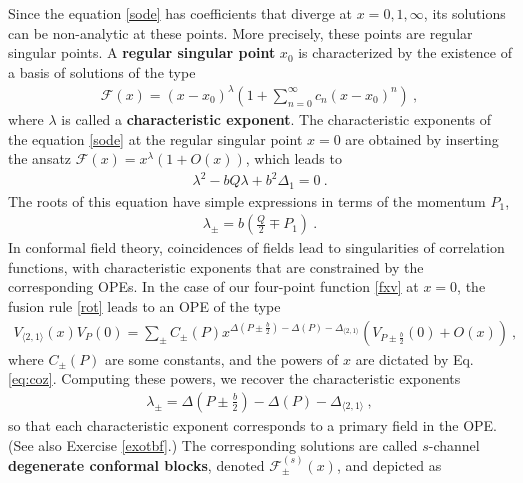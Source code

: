 \documentclass[12pt, a4paper, notitlepage, twoside]{report}
\numberwithin{equation}{section}
\theoremstyle{break}
\begin{document}
Since the equation \eqref{sode} has coefficients that diverge at $x=0,1,\infty$, its solutions can be non-analytic at these points. 
More precisely, these points are regular singular points.
A \textbf{regular singular point} $x_0$ is characterized by the existence of a basis of solutions of the type  
\begin{align}
 \mathcal{F}(x)=(x-x_0)^\lambda\left(1+\sum_{n=0}^\infty c_n (x-x_0)^n\right)\ ,
\label{zxl}
\end{align}
where $\lambda$ is called a \textbf{\boldmath characteristic exponent}.
The characteristic exponents of the equation \eqref{sode} at the regular singular point $x=0$ are obtained by inserting the ansatz $\mathcal{F}(x) = x^\lambda(1+O(x))$, which leads to 
\begin{align}
 \lambda^2 - bQ\lambda + b^2 \Delta_1 = 0 \ .
\end{align}
The roots of this equation have simple expressions in terms of the momentum $P_1$,
\begin{align}
 \lambda_\pm = b\left(\frac{Q}{2}\mp P_1\right) \ .
\label{lpm}
\end{align}
In conformal field theory, coincidences of fields lead to 
singularities of correlation functions, with characteristic exponents that are constrained by the corresponding OPEs.
In the case of our four-point function \eqref{fxv} at $x=0$, the fusion rule \eqref{rot} leads to an OPE of the type
\begin{align}
 V_{\langle 2,1 \rangle}(x)V_{P}(0) = \sum_\pm C_\pm(P) x^{\Delta\left(P\pm \frac{b}{2}\right) -\Delta(P) - \Delta_{\langle 2,1 \rangle}} \left(V_{P\pm\frac{b}{2}}(0) + O(x)\right)\ ,
\end{align}
where $C_\pm(P)$ are some constants, and the powers of $x$ are dictated by Eq. \eqref{eq:coz}. 
Computing these powers, we recover the characteristic exponents
\begin{align}
 \lambda_\pm = \Delta\left(P\pm \frac{b}{2}\right) -\Delta(P) - \Delta_{\langle 2,1 \rangle} \ ,
\end{align}
so that each characteristic exponent corresponds to a primary field in the OPE.
(See also Exercise \ref{exotbf}.) The corresponding solutions are called $s$-channel \textbf{degenerate conformal blocks}, denoted $\mathcal{F}^{(s)}_\pm(x)$, and depicted as
\end{document}
